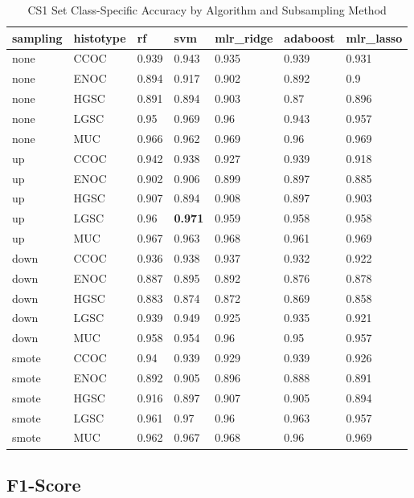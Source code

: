 \documentclass[
]{report}
\begin{document}
\begin{table}

\caption{\label{tab:cs1-accuracy-class-table}CS1 Set Class-Specific Accuracy by Algorithm and Subsampling Method}
\centering
\begin{tabular}[t]{l|l|l|l|l|l|l}
\hline
sampling & histotype & rf & svm & mlr\_ridge & adaboost & mlr\_lasso\\
\hline
none & CCOC & 0.939 & 0.943 & 0.935 & 0.939 & 0.931\\
\hline
none & ENOC & 0.894 & 0.917 & 0.902 & 0.892 & 0.9\\
\hline
none & HGSC & 0.891 & 0.894 & 0.903 & 0.87 & 0.896\\
\hline
none & LGSC & 0.95 & 0.969 & 0.96 & 0.943 & 0.957\\
\hline
none & MUC & 0.966 & 0.962 & 0.969 & 0.96 & 0.969\\
\hline
up & CCOC & 0.942 & 0.938 & 0.927 & 0.939 & 0.918\\
\hline
up & ENOC & 0.902 & 0.906 & 0.899 & 0.897 & 0.885\\
\hline
up & HGSC & 0.907 & 0.894 & 0.908 & 0.897 & 0.903\\
\hline
up & LGSC & 0.96 & \textbf{0.971} & 0.959 & 0.958 & 0.958\\
\hline
up & MUC & 0.967 & 0.963 & 0.968 & 0.961 & 0.969\\
\hline
down & CCOC & 0.936 & 0.938 & 0.937 & 0.932 & 0.922\\
\hline
down & ENOC & 0.887 & 0.895 & 0.892 & 0.876 & 0.878\\
\hline
down & HGSC & 0.883 & 0.874 & 0.872 & 0.869 & 0.858\\
\hline
down & LGSC & 0.939 & 0.949 & 0.925 & 0.935 & 0.921\\
\hline
down & MUC & 0.958 & 0.954 & 0.96 & 0.95 & 0.957\\
\hline
smote & CCOC & 0.94 & 0.939 & 0.929 & 0.939 & 0.926\\
\hline
smote & ENOC & 0.892 & 0.905 & 0.896 & 0.888 & 0.891\\
\hline
smote & HGSC & 0.916 & 0.897 & 0.907 & 0.905 & 0.894\\
\hline
smote & LGSC & 0.961 & 0.97 & 0.96 & 0.963 & 0.957\\
\hline
smote & MUC & 0.962 & 0.967 & 0.968 & 0.96 & 0.969\\
\hline
\end{tabular}
\end{table}

\hypertarget{f1-score-2}{%
\subsection{F1-Score}\label{f1-score-2}}
\end{document}
